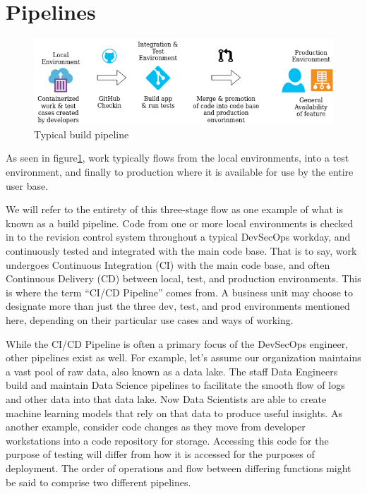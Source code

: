 \section{Pipelines}

\begin{figure}[!htb]
\centering
\includegraphics[scale=0.63]{../images/flow.png}
\caption{Typical build pipeline}
\label{pipeline}
\end{figure}

\justify{}
As seen in figure\ref{pipeline}, work typically flows from the local environments, into a test environment, and finally to production
where it is available for use by the entire user base.

\justify{}
We will refer to the entirety of this three-stage flow as one example of what is known as a build pipeline.
Code from one or more local environments is checked in to the revision control system throughout a
typical DevSecOps workday, and continuously tested and integrated with the main code base. That is to say, work undergoes
Continuous Integration (CI) with the main code base,
and often Continuous Delivery (CD) between local, test, and production environments. This is
where the term ``CI/CD Pipeline'' comes from. A business unit may choose to designate more than just the three dev, test,
and prod environments mentioned here, depending on their particular use cases and ways of working.

\justify{}
While the CI/CD Pipeline is often a primary focus of the DevSecOps engineer, other pipelines exist as well. For example,
let's assume our organization maintains a vast pool of raw data, also known as a data lake. The staff Data
Engineers build and maintain Data Science pipelines to facilitate the smooth flow
of logs and other data into that data lake. Now Data Scientists are able to create machine learning models that rely on that
data to produce useful insights. As another example, consider code changes as they move from
developer workstations into a code repository for storage. Accessing this code for the purpose of testing will differ from
how it is accessed for the purposes of deployment. The order of operations and flow
between differing functions might be said to comprise two different pipelines.


